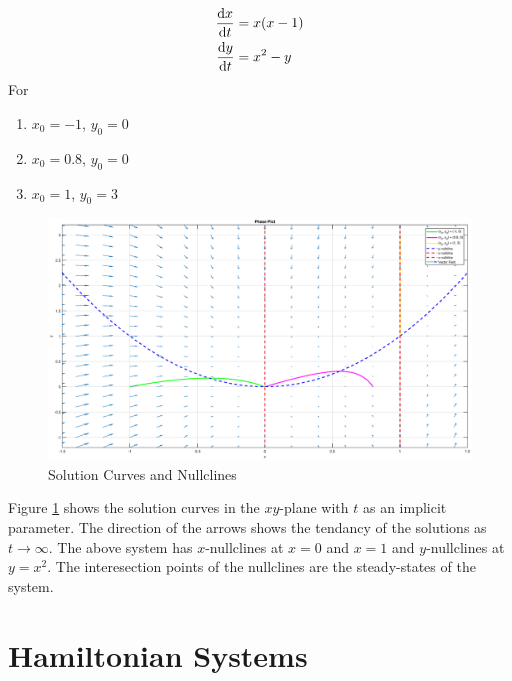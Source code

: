 \documentclass[12pt,1in]{article}
\newenvironment{Example}[2][Example]{\begin{trivlist}
		\item[\hskip \labelsep {\bfseries #1}\hskip \labelsep {\bfseries #2.}]}{\end{trivlist}}
\begin{document}
\begin{Example}{3}
	\cite[p.~487]{diff_eq}
	\begin{align*}
	\derivative{x}{t} &= x(x - 1)\\
	\derivative{y}{t} &= x^2 - y
	\end{align*}
	For 
	\begin{enumerate}
		\item $x_0 = -1$, $y_0 = 0$
		\item $x_0 = 0.8$, $y_0 = 0$
		\item $x_0 = 1$, $y_0 = 3$
	\end{enumerate}
\begin{figure}[H]
	\centering
	\includegraphics[trim={2in 0 2in 0},width=1\linewidth]{Figures/example_3_phase}
	\caption{Solution Curves and Nullclines}
	\label{fig:example3}
\end{figure}
Figure \ref{fig:example3} shows the solution curves in the $xy$-plane with $t$ as an implicit parameter. The direction of the arrows shows the tendancy of the solutions as $t\rightarrow\infty$. The above system has $x$-nullclines at $x = 0$ and $x = 1$ and $y$-nullclines at $y = x^2$. The interesection points of the nullclines are the steady-states of the system. 
 
\end{Example}
\section{Hamiltonian Systems}
\end{document}
